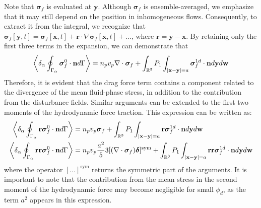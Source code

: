 Note that $\bm\sigma_f$ is evaluated at $\textbf{y}$. 
Although $\bm\sigma_f$ is ensemble-averaged, we emphasize that it may still depend on the position in inhomogeneous flows. 
Consequently, to extract it from the integral, we recognize that $\bm\sigma_f[\textbf{y},t] = \bm\sigma_f[\textbf{x},t] + \textbf{r}\cdot \nabla\bm\sigma_f[\textbf{x},t] + \ldots$, where $\textbf{r} = \textbf{y} - \textbf{x}$. 
By retaining only the first three terms in the expansion, we can demonstrate that
\begin{equation}
    \pSavg{\bm\sigma_f^0\cdot\textbf{n}}
    =
    n_p v_p 
    \div\bm\sigma_f
    +
    \int_{\mathbb{R}^3}
    P_1
    \int_{|\textbf{x}-\textbf{y}|=a}
    \bm\sigma_f^{1d} \cdot \textbf{n}
    d\textbf{y}d\textbf{w}
    \label{eq:drag_final}
\end{equation}
Therefore, it is evident that the drag force term contains a component related to the divergence of the mean fluid-phase stress, in addition to the contribution from the disturbance fields. 
Similar arguments can be extended to the first two moments of the hydrodynamic force traction. 
This expression can be written as:
\begin{align}
    \pSavg{\textbf{r}\bm\sigma_f^0\cdot\textbf{n}}
    &=
    n_p v_p \bm\sigma_f
    +
    \int_{\mathbb{R}^3}
    P_1
    \int_{|\textbf{x}-\textbf{y}|=a}
    \textbf{r}\bm\sigma_f^{1d} \cdot \textbf{n}
    d\textbf{y}
    d\textbf{w}
    \label{eq:first_mom_general}
    \\
    \pSavg{\textbf{rr}\bm\sigma_f^0\cdot\textbf{n}}
    &=
    n_pv_p  \frac{a^2}{5} 3 [(\div \bm\sigma_f)\bm\delta]^\text{sym}
    +
    \int_{\mathbb{R}^3}
    P_1
    \int_{|\textbf{x}-\textbf{y}|=a}
    \textbf{rr}\bm\sigma_f^{1d} \cdot \textbf{n}
    d\textbf{y}
    d\textbf{w}
    \label{eq:second_mom_general}
\end{align}
where the operator $[\ldots]^\text{sym}$ returns the symmetric part of the arguments. 
It is important to note that the contribution from the mean stress in the second moment of the hydrodynamic force may become negligible for small $\phi_d$, as the term $a^2$ appears in this expression. 

